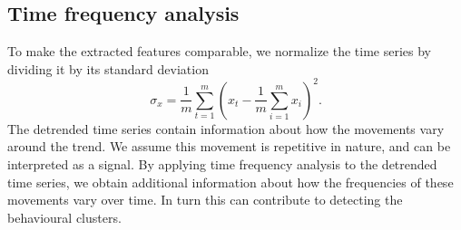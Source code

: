 \documentclass[a4paper, 10pt]{memoir}
\theoremstyle{plain}
\theoremstyle{definition}
\theoremstyle{remark}
\begin{document}
\subsection{Time frequency analysis}
To make the extracted features comparable, we normalize the time series by dividing it by its standard deviation
\begin{equation*}
        \sigma_x = \frac{1}{m}\sum_{t = 1}^{m} \left( x_t - \frac{1}{m}\sum_{i = 1}^{m}x_i \right)^2.
\end{equation*}
The detrended time series contain information about how the movements vary around the trend.
We assume this movement is repetitive in nature, and can be interpreted as a signal.
By applying time frequency analysis to the detrended time series, we obtain additional information about how the frequencies of these movements vary over time.
In turn this can contribute to detecting the behavioural clusters.
\end{document}
